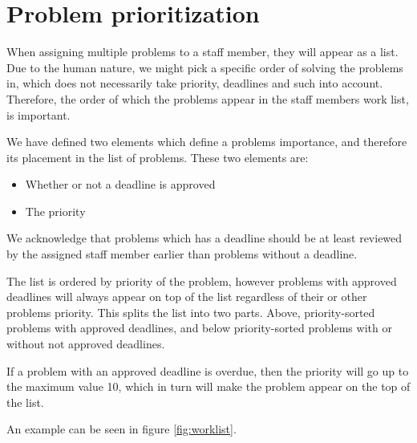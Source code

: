 \section{Problem prioritization}
\label{sec:problem_priority}

When assigning multiple problems to a staff member, they will appear as a list. 
Due to the human nature, we might pick a specific order of solving the problems in, which does not necessarily take priority, deadlines and such into account. 
Therefore, the order of which the problems appear in the staff members work list, is important.

We have defined two elements which define a problems importance, and therefore its placement in the list of problems. 
These two elements are:

\begin{itemize}
	\item Whether or not a deadline is approved
	\item The priority
\end{itemize}

We acknowledge that problems which has a deadline should be at least reviewed by the assigned staff member earlier than problems without a deadline.

The list is ordered by priority of the problem, however problems with approved deadlines will always appear on top of the list regardless of their or other problems priority. 
This splits the list into two parts. Above, priority-sorted problems with approved deadlines, and below priority-sorted problems with or without not approved deadlines. 

If a problem with an approved deadline is overdue, then the priority will go up to the maximum value 10, which in turn will make the problem appear on the top of the list.

An example can be seen in figure \ref{fig:worklist}.